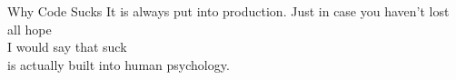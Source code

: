 \documentclass[bigger]{beamer}
\begin{document}
\begin{frame}{Why Code Sucks}
{    It is always put into production.
    \vfil
    Just in case you haven't lost all hope\\
    I would say that suck\\
    is actually built into human psychology.
  }
\end{frame}
\end{document}
